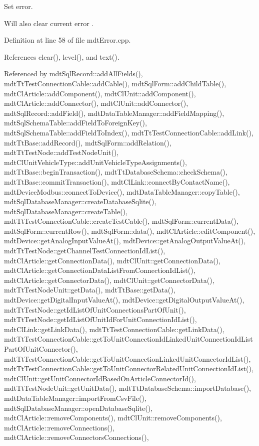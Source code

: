 Set error. 

Will also clear current error . 

Definition at line 58 of file mdt\-Error.\-cpp.



References clear(), level(), and text().



Referenced by mdt\-Sql\-Record\-::add\-All\-Fields(), mdt\-Tt\-Test\-Connection\-Cable\-::add\-Cable(), mdt\-Sql\-Form\-::add\-Child\-Table(), mdt\-Cl\-Article\-::add\-Component(), mdt\-Cl\-Unit\-::add\-Component(), mdt\-Cl\-Article\-::add\-Connector(), mdt\-Cl\-Unit\-::add\-Connector(), mdt\-Sql\-Record\-::add\-Field(), mdt\-Data\-Table\-Manager\-::add\-Field\-Mapping(), mdt\-Sql\-Schema\-Table\-::add\-Field\-To\-Foreign\-Key(), mdt\-Sql\-Schema\-Table\-::add\-Field\-To\-Index(), mdt\-Tt\-Test\-Connection\-Cable\-::add\-Link(), mdt\-Tt\-Base\-::add\-Record(), mdt\-Sql\-Form\-::add\-Relation(), mdt\-Tt\-Test\-Node\-::add\-Test\-Node\-Unit(), mdt\-Cl\-Unit\-Vehicle\-Type\-::add\-Unit\-Vehicle\-Type\-Assignments(), mdt\-Tt\-Base\-::begin\-Transaction(), mdt\-Tt\-Database\-Schema\-::check\-Schema(), mdt\-Tt\-Base\-::commit\-Transaction(), mdt\-Cl\-Link\-::connect\-By\-Contact\-Name(), mdt\-Device\-Modbus\-::connect\-To\-Device(), mdt\-Data\-Table\-Manager\-::copy\-Table(), mdt\-Sql\-Database\-Manager\-::create\-Database\-Sqlite(), mdt\-Sql\-Database\-Manager\-::create\-Table(), mdt\-Tt\-Test\-Connection\-Cable\-::create\-Test\-Cable(), mdt\-Sql\-Form\-::current\-Data(), mdt\-Sql\-Form\-::current\-Row(), mdt\-Sql\-Form\-::data(), mdt\-Cl\-Article\-::edit\-Component(), mdt\-Device\-::get\-Analog\-Input\-Value\-At(), mdt\-Device\-::get\-Analog\-Output\-Value\-At(), mdt\-Tt\-Test\-Node\-::get\-Channel\-Test\-Connection\-Id\-List(), mdt\-Cl\-Article\-::get\-Connection\-Data(), mdt\-Cl\-Unit\-::get\-Connection\-Data(), mdt\-Cl\-Article\-::get\-Connection\-Data\-List\-From\-Connection\-Id\-List(), mdt\-Cl\-Article\-::get\-Connector\-Data(), mdt\-Cl\-Unit\-::get\-Connector\-Data(), mdt\-Tt\-Test\-Node\-Unit\-::get\-Data(), mdt\-Tt\-Base\-::get\-Data(), mdt\-Device\-::get\-Digital\-Input\-Value\-At(), mdt\-Device\-::get\-Digital\-Output\-Value\-At(), mdt\-Tt\-Test\-Node\-::get\-Id\-List\-Of\-Unit\-Connections\-Part\-Of\-Unit(), mdt\-Tt\-Test\-Node\-::get\-Id\-List\-Of\-Unit\-Id\-For\-Unit\-Connection\-Id\-List(), mdt\-Cl\-Link\-::get\-Link\-Data(), mdt\-Tt\-Test\-Connection\-Cable\-::get\-Link\-Data(), mdt\-Tt\-Test\-Connection\-Cable\-::get\-To\-Unit\-Connection\-Id\-Linked\-Unit\-Connection\-Id\-List\-Part\-Of\-Unit\-Connector(), mdt\-Tt\-Test\-Connection\-Cable\-::get\-To\-Unit\-Connection\-Linked\-Unit\-Connector\-Id\-List(), mdt\-Tt\-Test\-Connection\-Cable\-::get\-To\-Unit\-Connector\-Related\-Unit\-Connection\-Id\-List(), mdt\-Cl\-Unit\-::get\-Unit\-Connector\-Id\-Based\-On\-Article\-Connector\-Id(), mdt\-Tt\-Test\-Node\-Unit\-::get\-Unit\-Data(), mdt\-Tt\-Database\-Schema\-::import\-Database(), mdt\-Data\-Table\-Manager\-::import\-From\-Csv\-File(), mdt\-Sql\-Database\-Manager\-::open\-Database\-Sqlite(), mdt\-Cl\-Article\-::remove\-Components(), mdt\-Cl\-Unit\-::remove\-Components(), mdt\-Cl\-Article\-::remove\-Connections(), mdt\-Cl\-Article\-::remove\-Connectors\-Connections(), 